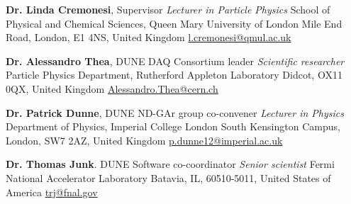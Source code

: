 \begin{list}{\scalebox{0.7}{$\square$}}{\leftmargin=1em \itemindent=0em}
	\item \textbf{Dr. Linda Cremonesi}, Supervisor \newline \textit{Lecturer in Particle Physics} \newline School of Physical and Chemical Sciences, Queen Mary University of London  Mile End Road, London, E1 4NS, United Kingdom \newline \href{mailto:l.cremonesi@qmul.ac.uk}{l.cremonesi@qmul.ac.uk} 
	\item \textbf{Dr. Alessandro Thea}, DUNE DAQ Consortium leader \newline \textit{Scientific researcher} \newline  Particle Physics Department, Rutherford Appleton Laboratory \newline Didcot, OX11 0QX, United Kingdom \newline \href{mailto:Alessandro.Thea@cern.ch}{Alessandro.Thea@cern.ch} 
	\item \textbf{Dr. Patrick Dunne}, DUNE ND-GAr group co-convener \newline \textit{Lecturer in Physics} \newline Department of Physics, Imperial College London \newline South Kensington Campus, London, SW7 2AZ, United Kingdom \newline \href{mailto:p.dunne12@imperial.ac.uk}{p.dunne12@imperial.ac.uk} 
	\item \textbf{Dr. Thomas Junk}. DUNE Software co-coordinator \newline \textit{Senior scientist} \newline Fermi National Accelerator Laboratory \newline Batavia, IL, 60510-5011, United States of America \newline \href{mailto:trj@fnal.gov}{trj@fnal.gov}
\end{list}
